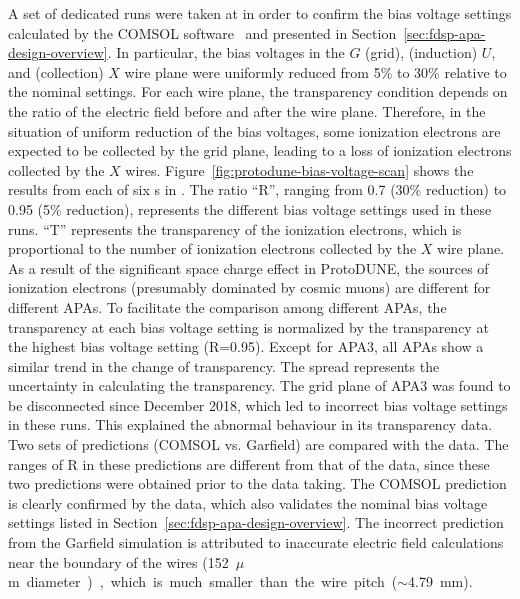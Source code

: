 A set of dedicated runs were taken at  in order to confirm the bias voltage settings calculated by the COMSOL software~\cite{COMSOL} and presented in Section~\ref{sec:fdsp-apa-design-overview}. In particular, the bias voltages in the $G$ (grid), (induction) $U$, and (collection) $X$ wire plane were uniformly reduced from 5\% to 30\% relative to the nominal settings. For each wire plane, the transparency condition depends on the ratio of the electric field before and after the wire plane. Therefore, in the situation of uniform reduction of the bias voltages, some ionization electrons are expected to be collected by the grid plane, leading to a loss of ionization electrons collected by the $X$ wires. Figure~\ref{fig:protodune-bias-voltage-scan} shows the results from each of six s in . The ratio ``R'', ranging from 0.7 (30\% reduction) to 0.95 (5\% reduction), represents the different bias voltage settings used in these runs. ``T'' represents the transparency of the ionization electrons, which is proportional to the number of ionization electrons collected by the $X$ wire plane. As a result of the significant space charge effect in ProtoDUNE, the sources of ionization electrons (presumably dominated by cosmic muons) are different for different APAs. To facilitate the comparison among different APAs, the transparency at each bias voltage setting is normalized by the transparency at the highest bias voltage setting (R=0.95). Except for APA3, all APAs show a similar trend in the change of transparency. The spread represents the uncertainty in calculating the transparency. The grid plane of APA3 was found to be disconnected since December 2018, which led to incorrect bias voltage settings in these runs. This explained the abnormal behaviour in its transparency data. Two sets of predictions (COMSOL vs. Garfield) are compared with the  data. The ranges of R in these predictions are different from that of the  data, since these two predictions were obtained prior to the  data taking. The COMSOL prediction is clearly confirmed by the  data, which also validates the nominal bias voltage settings listed in Section~\ref{sec:fdsp-apa-design-overview}. The incorrect prediction from the Garfield simulation is attributed to inaccurate electric field calculations near the boundary of the wires (\SI{152}{$\mu$m} diameter), which is much smaller than the wire pitch ($\sim$\SI{4.79}{mm}). 

